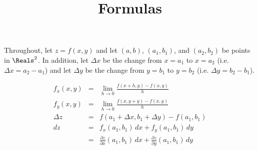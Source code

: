 \documentclass[12pt]{article}
\title{\vspace{-0.75in}\Huge{Formulas}\vspace{-0.5in}}
\date{}
\begin{document}
	\maketitle\vspace{-6mm}
	
	Throughout, let $z=f(x,y)$ and let $(a,b)$, $(a_1,b_1)$, and $(a_2,b_2)$ be points in $\Reals^2$. In addition, let $\Delta x$ be the change from $x=a_1$ to $x=a_2$ (i.e. $\Delta x = a_2 - a_1$) and let $\Delta y$ be the change from $y=b_1$ to $y=b_2$ (i.e. $\Delta y = b_2 - b_1$).
	
	$$
		\begin{array}{rcl}
			f_x(x,y) & = & \lim_{h\to0}\frac{f(x+h,y)-f(x,y)}{h}\\[6mm]
			f_y(x,y) & = & \lim_{h\to0}\frac{f(x,y+y)-f(x,y)}{h}\\[6mm]
			\Delta z & = & f(a_1+\Delta x,b_1+\Delta y)-f(a_1,b_1)\\[6mm]
			dz & = & f_x(a_1,b_1)\,dx + f_y(a_1,b_1)\,dy\\[3mm]
			& = & \frac{\partial z}{\partial x}(a_1,b_1)\,dx + \frac{\partial z}{\partial y}(a_1,b_1)\,dy
		\end{array}
	$$
\end{document}
